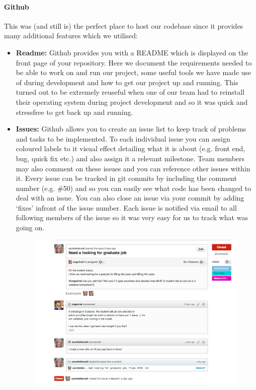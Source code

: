     \paragraph{Github\cite{github}} This was (and still is) the perfect place to host our codebase since it provides many additional features which we utilised:
    \begin{itemize}
        \item \textbf{Readme:} Github provides you with a README which is displayed on the front page of your repository. Here we document the requirements needed to be able to work on and run our project, some useful tools we have made use of during development and how to get our project up and running. This turned out to be extremely reuseful when one of our team had to reinstall their operating system during project development and so it was quick and stressfree to get back up and running.
        \item \textbf{Issues:} Github allows you to create an issue list to keep track of problems and tasks to be implemented. To each individual issue you can assign coloured labels to it visual effect detailing what it is about (e.g. front end, bug, quick fix etc.) and also assign it a relevant milestone. Team members may also comment on these issues and you can reference other issues within it. Every issue can be tracked in git commits by including the comment number (e.g. \#50) and so you can easily see what code has been changed to deal with an issue. You can also close an issue via your commit by adding `fixes' infront of the issue number. Each issue is notified via email to all following members of the issue so it was very easy for us to track what was going on. 

        \begin{figure}[H]\centering
        \includegraphics[scale=0.3]{images/project_management/team_management/graduate_issue}


\end{figure}
\end{itemize}
